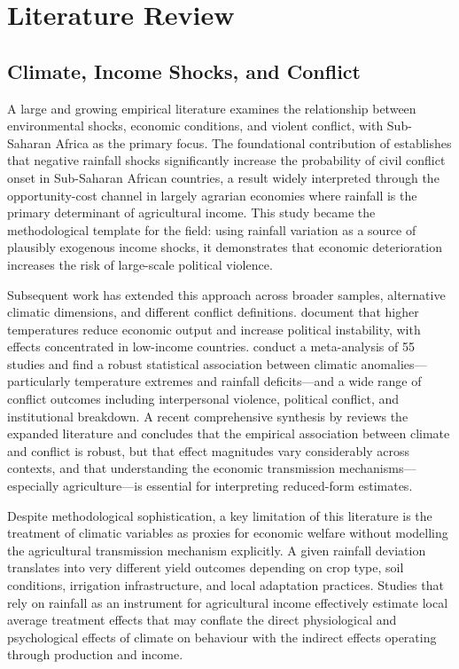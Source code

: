\section{Literature Review}
\label{sec:litreview}

\subsection{Climate, Income Shocks, and Conflict}

A large and growing empirical literature examines the relationship between environmental shocks, economic conditions, and violent conflict, with Sub-Saharan Africa as the primary focus. The foundational contribution of \citet{MiguelSatyanathSergenti2004} establishes that negative rainfall shocks significantly increase the probability of civil conflict onset in Sub-Saharan African countries, a result widely interpreted through the opportunity-cost channel in largely agrarian economies where rainfall is the primary determinant of agricultural income. This study became the methodological template for the field: using rainfall variation as a source of plausibly exogenous income shocks, it demonstrates that economic deterioration increases the risk of large-scale political violence.

Subsequent work has extended this approach across broader samples, alternative climatic dimensions, and different conflict definitions. \citet{DellJonesOlken2014} document that higher temperatures reduce economic output and increase political instability, with effects concentrated in low-income countries. \citet{BurkeHsiangMiguel2015} conduct a meta-analysis of 55 studies and find a robust statistical association between climatic anomalies---particularly temperature extremes and rainfall deficits---and a wide range of conflict outcomes including interpersonal violence, political conflict, and institutional breakdown. A recent comprehensive synthesis by \citet{BurkeFergusonHsiangMiguel2024} reviews the expanded literature and concludes that the empirical association between climate and conflict is robust, but that effect magnitudes vary considerably across contexts, and that understanding the economic transmission mechanisms---especially agriculture---is essential for interpreting reduced-form estimates.

Despite methodological sophistication, a key limitation of this literature is the treatment of climatic variables as proxies for economic welfare without modelling the agricultural transmission mechanism explicitly. A given rainfall deviation translates into very different yield outcomes depending on crop type, soil conditions, irrigation infrastructure, and local adaptation practices. Studies that rely on rainfall as an instrument for agricultural income effectively estimate local average treatment effects that may conflate the direct physiological and psychological effects of climate on behaviour with the indirect effects operating through production and income.

